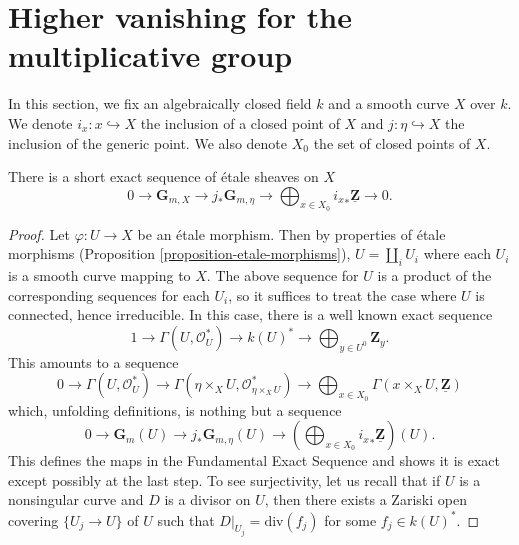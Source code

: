 \section{Higher vanishing for the multiplicative group}
\label{section-higher-Gm}

\noindent
In this section, we fix an algebraically closed field $k$ and a smooth curve
$X$ over $k$. We denote $i_x : x \hookrightarrow X$ the inclusion of a closed
point of $X$ and $j : \eta \hookrightarrow X$ the inclusion of the generic
point. We also denote $X_0$ the set of closed points of $X$.

\begin{theorem}
\label{theorem-fundamental-exact-sequence}
There is a short exact sequence of \'etale sheaves on $X$
$$
0 \longrightarrow
\mathbf{G}_{m, X} \longrightarrow
j_* \mathbf{G}_{m, \eta} \longrightarrow
\bigoplus\nolimits_{x \in X_0} {i_x}_* \underline{\mathbf{Z}}
\longrightarrow 0.
$$
\end{theorem}

\begin{proof}
Let $\varphi : U \to X$ be an \'etale morphism. Then by properties of
\'etale morphisms (Proposition \ref{proposition-etale-morphisms}),
$U = \coprod_i U_i$ where each $U_i$ is a smooth curve mapping to $X$.
The above sequence for $U$ is a product of the corresponding sequences
for each $U_i$, so it suffices to treat the case where $U$ is connected,
hence irreducible. In this case, there is a well known exact sequence
$$
1 \longrightarrow
\Gamma(U, \mathcal{O}_U^*) \longrightarrow
k(U)^* \longrightarrow \bigoplus\nolimits_{y \in U^0} \mathbf{Z}_y.
$$
This amounts to a sequence
$$
0 \longrightarrow \Gamma(U, \mathcal{O}_U^*) \longrightarrow
\Gamma(\eta \times_X U, \mathcal{O}_{\eta \times_X U}^*) \longrightarrow
\bigoplus\nolimits_{x \in X_0}
\Gamma(x \times_X U, \underline{\mathbf{Z}})
$$
which, unfolding definitions, is nothing but a sequence
$$
0 \longrightarrow \mathbf{G}_m(U) \longrightarrow
j_* \mathbf{G}_{m, \eta}(U) \longrightarrow
\left(\bigoplus\nolimits_{x \in X_0} {i_x}_* \underline{\mathbf{Z}}\right)(U).
$$
This defines the maps in the Fundamental Exact Sequence and shows it is exact
except possibly at the last step. To see surjectivity, let us recall that if
$U$ is a nonsingular curve and $D$ is a divisor on $U$,
then there exists a Zariski open covering $\{U_j \to U\}$ of $U$
such that $D|_{U_j} = \text{div}(f_j)$ for some $f_j \in k(U)^*$.
\end{proof}

